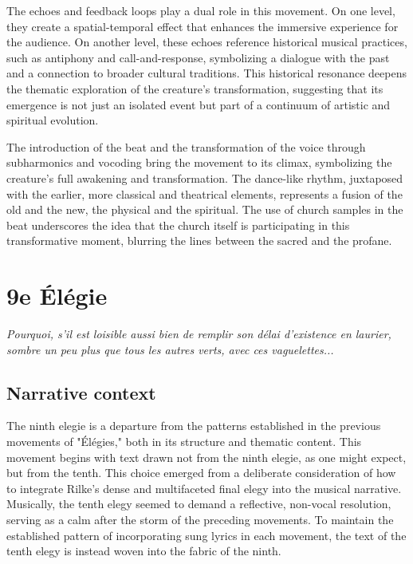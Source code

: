 \documentclass[12pt,twoside,maitrise]{dms_ks}
\theoremstyle{definition}
\begin{document}
The echoes and feedback loops play a dual role in this movement. 
On one level, they create a spatial-temporal effect that enhances the immersive experience for the audience. 
On another level, these echoes reference historical musical practices, such as antiphony and call-and-response, symbolizing a dialogue with the past and a connection to broader cultural traditions. 
This historical resonance deepens the thematic exploration of the creature’s transformation, suggesting that its emergence is not just an isolated event but part of a continuum of artistic and spiritual evolution.

The introduction of the beat and the transformation of the voice through subharmonics and vocoding bring the movement to its climax, symbolizing the creature’s full awakening and transformation. 
The dance-like rhythm, juxtaposed with the earlier, more classical and theatrical elements, represents a fusion of the old and the new, the physical and the spiritual. 
The use of church samples in the beat underscores the idea that the church itself is participating in this transformative moment, blurring the lines between the sacred and the profane.

\section{9e Élégie}

\epigraph{\textit{Pourquoi, s’il est loisible aussi bien de remplir son délai d’existence en laurier, sombre un peu plus que tous les autres verts, avec ces vaguelettes...}}{}

\subsection{Narrative context}

The ninth elegie is a departure from the patterns established in the previous movements of "Élégies," both in its structure and thematic content. 
This movement begins with text drawn not from the ninth elegie, as one might expect, but from the tenth. 
This choice emerged from a deliberate consideration of how to integrate Rilke’s dense and multifaceted final elegy into the musical narrative. 
Musically, the tenth elegy seemed to demand a reflective, non-vocal resolution, serving as a calm after the storm of the preceding movements. 
To maintain the established pattern of incorporating sung lyrics in each movement, the text of the tenth elegy is instead woven into the fabric of the ninth.
\end{document}
